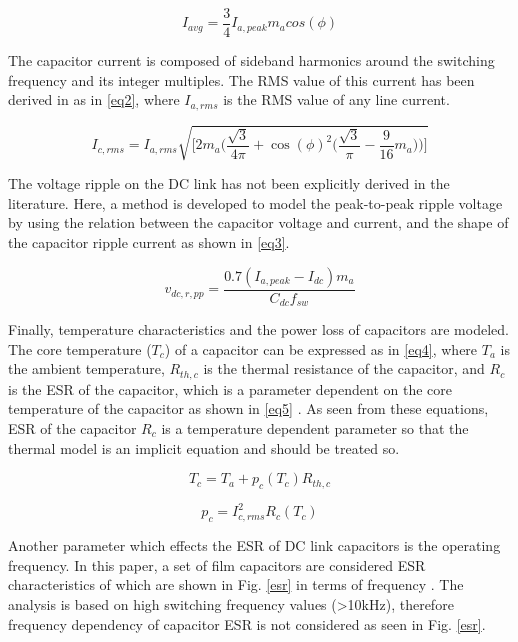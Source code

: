 \documentclass[conference,a4paper,twocolumn]{IEEEtran}
\begin{document}
\begin{equation}
\label{eq1}
I_{avg} = \frac{3}{4}I_{a,peak}m_acos(\phi)
\end{equation}


The capacitor current is composed of sideband harmonics around the switching frequency and its integer multiples. The RMS value of this current has been derived in \cite{Su2010,Bianchi2003} as in \ref{eq2}, where $I_{a,rms}$ is the RMS value of any line current.

\begin{equation}
\label{eq2}
I_{c,rms} = I_{a,rms}\sqrt{\bigg[2m_a\Big(\frac{\sqrt{3}}{4\pi}+\cos(\phi)^2\big(\frac{\sqrt{3}}{\pi}-\frac{9}{16}m_a\big)\Big)\bigg]}
\end{equation}


The voltage ripple on the DC link has not been explicitly derived in the literature. Here, a method is developed to model the peak-to-peak ripple voltage by using the relation between the capacitor voltage and current, and the shape of the capacitor ripple current as shown in \ref{eq3}.


\begin{equation}
\label{eq3}
v_{dc,r,pp} = \frac{0.7(I_{a,peak}-I_{dc})m_a}{C_{dc}f_{sw}}
\end{equation}


Finally, temperature characteristics and the power loss of capacitors are modeled. The core temperature ($T_c$) of a capacitor can be expressed as in \ref{eq4}, where $T_a$ is the ambient temperature, $R_{th,c}$ is the thermal resistance of the capacitor, and $R_c$ is the ESR of the capacitor, which is a parameter dependent on the core temperature of the capacitor as shown in \ref{eq5} \cite{Bianchi2003}. As seen from these equations, ESR of the capacitor $R_c$ is a temperature dependent parameter so that the thermal model is an implicit equation and should be treated so.


\begin{equation}
\label{eq4}
T_{c} = T_{a}+p_{c}(T_{c})R_{th,c}
\end{equation}


\begin{equation}
\label{eq5}
p_{c} = I_{c,rms}^2R_{c}(T_c)
\end{equation}

Another parameter which effects the ESR of DC link capacitors is the operating frequency. In this paper, a set of film capacitors are considered ESR characteristics of which are shown in Fig. \ref{esr} in terms of frequency \cite{Polypropylene2009}. The analysis is based on high switching frequency values (>10kHz), therefore frequency dependency of capacitor ESR is not considered as seen in Fig. \ref{esr}. 
\end{document}
